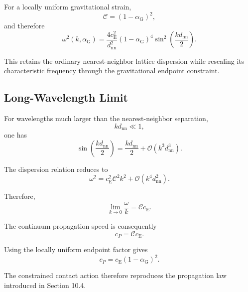 For a locally uniform gravitational strain,
\begin{equation}
    \mathcal{C} = \left( 1-\alpha_{\mathrm{G}} \right)^2,
\end{equation}
and therefore
\begin{equation}
    \boxed{ \omega^2(k,\alpha_{\mathrm{G}}) = \frac{4c_{\mathrm{E}}^2}{d_{\mathrm{nn}}^2} \left( 1-\alpha_{\mathrm{G}} \right)^4 \sin^2 \left( \frac{kd_{\mathrm{nn}}}{2} \right) }.
\end{equation}

This retains the ordinary nearest-neighbor lattice dispersion while rescaling its characteristic frequency through the gravitational endpoint constraint.

\subsection{Long-Wavelength Limit}

For wavelengths much larger than the nearest-neighbor separation,
\begin{equation}
    kd_{\mathrm{nn}} \ll 1,
\end{equation}
one has
\begin{equation}
    \sin \left( \frac{kd_{\mathrm{nn}}}{2} \right) = \frac{kd_{\mathrm{nn}}}{2} + \mathcal{O}\left( k^3d_{\mathrm{nn}}^3 \right).
\end{equation}

The dispersion relation reduces to
\begin{equation}
    \omega^2 = c_{\mathrm{E}}^2\mathcal{C}^2k^2 + \mathcal{O}\left( k^4d_{\mathrm{nn}}^2 \right).
\end{equation}

Therefore,
\begin{equation}
    \lim_{k\rightarrow 0} \frac{\omega}{k} = \mathcal{C} c_{\mathrm{E}}.
\end{equation}

The continuum propagation speed is consequently
\begin{equation}
    \boxed{ c_P = \mathcal{C} c_{\mathrm{E}} }.
\end{equation}

Using the locally uniform endpoint factor gives
\begin{equation}
    \boxed{ c_P = c_{\mathrm{E}} \left( 1-\alpha_{\mathrm{G}} \right)^2 }.
\end{equation}

The constrained contact action therefore reproduces the propagation law introduced in Section 10.4.

